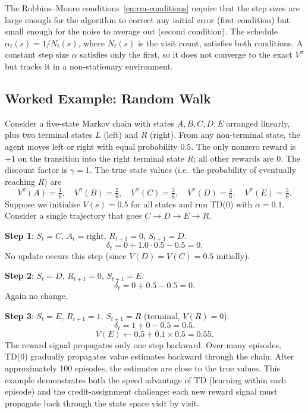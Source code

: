 The Robbins--Monro conditions~\eqref{eq:rm-conditions} require that the step sizes are large enough for the algorithm to correct any initial error (first condition) but small enough for the noise to average out (second condition).  The schedule $\alpha_t(s) = 1/N_t(s)$, where $N_t(s)$ is the visit count, satisfies both conditions.  A constant step size $\alpha$ satisfies only the first, so it does not converge to the exact $V^\pi$ but tracks it in a non-stationary environment.

\subsection{Worked Example: Random Walk}

\begin{example}
\label{ex:random-walk}
Consider a five-state Markov chain with states $A, B, C, D, E$ arranged linearly, plus two terminal states $L$ (left) and $R$ (right).  From any non-terminal state, the agent moves left or right with equal probability $0.5$.  The only nonzero reward is $+1$ on the transition into the right terminal state $R$; all other rewards are $0$.  The discount factor is $\gamma = 1$.  The true state values (i.e.\ the probability of eventually reaching $R$) are
\[
V^\pi(A)=\tfrac{1}{6}, \quad V^\pi(B)=\tfrac{2}{6}, \quad V^\pi(C)=\tfrac{3}{6}, \quad V^\pi(D)=\tfrac{4}{6}, \quad V^\pi(E)=\tfrac{5}{6}.
\]
Suppose we initialise $V(s) = 0.5$ for all states and run TD(0) with $\alpha = 0.1$.  Consider a single trajectory that goes $C \to D \to E \to R$.

\textbf{Step 1}: $S_t = C$, $A_t = \text{right}$, $R_{t+1} = 0$, $S_{t+1} = D$.
\[
\delta_t = 0 + 1.0 \cdot 0.5 - 0.5 = 0.
\]
No update occurs this step (since $V(D) = V(C) = 0.5$ initially).

\textbf{Step 2}: $S_t = D$, $R_{t+1} = 0$, $S_{t+1} = E$.
\[
\delta_t = 0 + 0.5 - 0.5 = 0.
\]
Again no change.

\textbf{Step 3}: $S_t = E$, $R_{t+1} = 1$, $S_{t+1} = R$ (terminal, $V(R)=0$).
\[
\delta_t = 1 + 0 - 0.5 = 0.5.
\]
\[
V(E) \leftarrow 0.5 + 0.1 \times 0.5 = 0.55.
\]
The reward signal propagates only one step backward.  Over many episodes, TD(0) gradually propagates value estimates backward through the chain.  After approximately 100 episodes, the estimates are close to the true values.  This example demonstrates both the speed advantage of TD (learning within each episode) and the credit-assignment challenge: each new reward signal must propagate back through the state space visit by visit.
\end{example}

